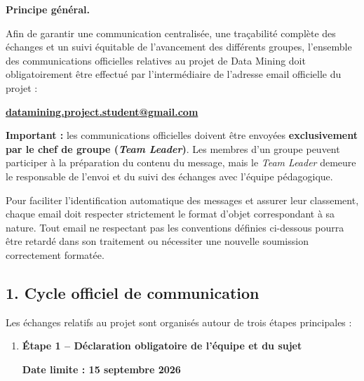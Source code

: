 \documentclass[11pt,a4paper]{article}
\begin{document}
\begin{tcolorbox}[
    colback=sintefblue!8,
    colframe=sintefblue,
    title=\textbf{DIRECTIVES OFFICIELLES DE COMMUNICATION, DE SUIVI ET DE RENDU},
    arc=2mm,
    boxrule=0.8pt,
    breakable
]

\textbf{Principe général.}

Afin de garantir une communication centralisée, une traçabilité complète des échanges
et un suivi équitable de l'avancement des différents groupes, l'ensemble des
communications officielles relatives au projet de Data Mining doit obligatoirement
être effectué par l'intermédiaire de l'adresse email officielle du projet :

\begin{center}
    \Large
    \textbf{\url{datamining.project.student@gmail.com}}
\end{center}

\textbf{Important :} les communications officielles doivent être envoyées
\textbf{exclusivement par le chef de groupe (\textit{Team Leader})}.
Les membres d'un groupe peuvent participer à la préparation du contenu du message,
mais le \textit{Team Leader} demeure le responsable de l'envoi et du suivi des
échanges avec l'équipe pédagogique.

\vspace{2mm}

Pour faciliter l'identification automatique des messages et assurer leur classement,
chaque email doit respecter strictement le format d'objet correspondant à sa nature.
Tout email ne respectant pas les conventions définies ci-dessous pourra être
retardé dans son traitement ou nécessiter une nouvelle soumission correctement
formatée.

\subsection*{1. Cycle officiel de communication}

Les échanges relatifs au projet sont organisés autour de trois étapes principales :

\begin{enumerate}[leftmargin=*]

    \item \textbf{Étape 1 -- Déclaration obligatoire de l'équipe et du sujet}

    \textbf{Date limite : 15 septembre 2026}


\end{enumerate}
\end{tcolorbox}
\end{document}

